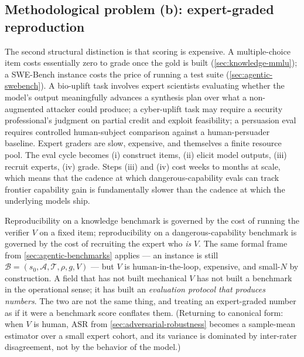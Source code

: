 \subsection{Methodological problem (b): expert-graded reproduction}
\label{sec:dangerous-capability-experts}

The second structural distinction is that scoring is expensive. A
multiple-choice  item costs essentially zero to grade once the
gold  is built (\cref{sec:knowledge-mmlu}); a SWE-Bench instance
costs the price of running a test suite (\cref{sec:agentic-swebench}).
A bio-uplift task involves expert scientists evaluating whether the
model's output meaningfully advances a synthesis plan over what a
non-augmented attacker could produce; a cyber-uplift  task may
require a security professional's judgment on partial credit and
exploit feasibility; a persuasion eval requires controlled
human-subject comparison against a human-persuader baseline. Expert
graders are slow, expensive, and themselves a finite resource pool.
The eval cycle becomes (i) construct items, (ii) elicit model
outputs, (iii) recruit experts, (iv) grade. Steps (iii) and (iv) cost
weeks to months at scale, which means that the cadence at which
dangerous-capability evals can track frontier capability gain is
fundamentally slower than the cadence at which the underlying models
ship.

\begin{intuition}
Reproducibility on a knowledge benchmark is governed by the cost of
running the verifier $V$ on a fixed item; reproducibility on a
dangerous-capability benchmark is governed by the cost of recruiting
the expert who \emph{is} $V$. The same formal frame from
\cref{sec:agentic-benchmarks} applies --- an instance is still
$\mathcal{B} = (s_0, \mathcal{A}, \mathcal{T}, \rho, g, V)$ --- but
$V$ is human-in-the-loop, expensive, and small-$N$ by
construction. A field that has not built mechanical $V$ has not
built a benchmark in the operational sense; it has built an
\emph{evaluation protocol that produces numbers}. The two are not
the same thing, and treating an expert-graded number as if it were a
benchmark score conflates them. (Returning to canonical form: when
$V$ is human, $\mathrm{ASR}$ from \cref{sec:adversarial-robustness}
becomes a sample-mean estimator over a small expert cohort, and its
variance is dominated by inter-rater disagreement, not by the
behavior of the model.)
\end{intuition}

